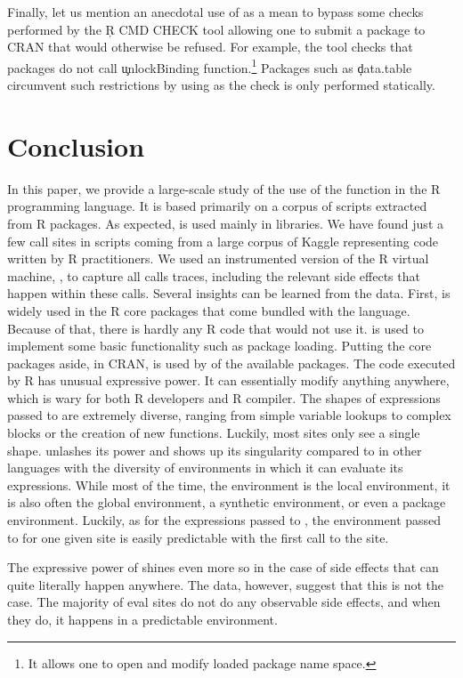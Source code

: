 \documentclass[review,screen,acmsmall,anonymous=true]{acmart}
\begin{document}
Finally, let us mention an anecdotal use of \eval as a mean to bypass some
checks performed by the \c{R CMD CHECK} tool allowing one to submit a package
to CRAN that would otherwise be refused. For example, the tool checks that
packages do not call \c{unlockBinding} function.\footnote{It allows one to open
and modify loaded package name space.} Packages such as \c{data.table}
circumvent such restrictions by using \eval as the check is only performed
statically.

\section{Conclusion}

In this paper, we provide a large-scale study of the use of the \eval function
in the R programming language. It is based primarily on a corpus of
\CranRunnableScripts scripts extracted from \CranPackages R packages. As
expected, \eval is used mainly in libraries. We have found just a few \eval
call sites in scripts coming from a large corpus of Kaggle representing code
written by R practitioners. We used an instrumented version of the R virtual
machine, \rdyntrace, to capture all \eval calls traces, including the relevant
side effects that happen within these calls. Several insights can be learned
from the data.
%
First, \eval is widely used in the R core packages that come bundled with the
language. Because of that, there is hardly any R code that would not use it.
\eval is used to implement some basic functionality such as package loading.
Putting the core packages aside, in CRAN, \eval is used by \PkgPackagesRatio of
the available \CranPackages packages.
%
The code executed by R \eval has unusual expressive power. It can essentially
modify anything anywhere, which is wary for both R developers and R compiler. The shapes of expressions passed to \eval are extremely diverse, ranging from simple variable lookups to complex blocks or the creation of new functions. Luckily, most sites only see a single shape. \eval unlashes its power and shows up its singularity compared to \eval in other languages with the diversity of environments in which it can evaluate its expressions. While most of the time, the \eval environment is the local environment, it is also often the global environment, a synthetic environment, or even a package environment. Luckily, as for the expressions passed to \eval, the environment passed to \eval for one given site is easily predictable with the first call to the site.

The expressive power of \eval shines even more  so in the case of side effects that can quite literally happen anywhere. The data, however, suggest that this is not the case. The majority of eval sites do not do any observable side effects,  and when they do, it happens in a predictable environment.
\end{document}
